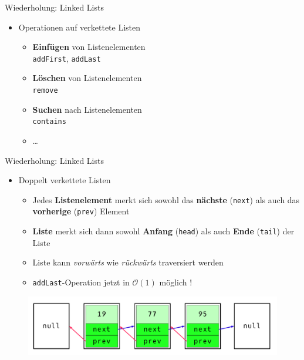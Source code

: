 \documentclass[18pt]{beamer}
\begin{document}
\begin{frame}{Wiederholung: Linked Lists}
    \begin{itemize}
        \item Operationen auf verkettete Listen
        \begin{itemize}
            \item \textbf{Einfügen} von Listenelementen\\
            \texttt{addFirst}, \texttt{addLast}
            \item \textbf{Löschen} von Listenelementen\\
            \texttt{remove}
            \item \textbf{Suchen} nach Listenelementen\\
            \texttt{contains}
            \item \dots
        \end{itemize}
    \end{itemize}

\end{frame}

\begin{frame}{Wiederholung: Linked Lists}
    \begin{itemize}
        \item Doppelt verkettete Listen
        \begin{itemize}
            \item Jedes \textbf{Listenelement} merkt sich sowohl das \textbf{nächste} (\texttt{next}) als auch das \textbf{vorherige} (\texttt{prev}) Element
            \item \textbf{Liste} merkt sich dann sowohl \textbf{Anfang} (\texttt{head}) als auch \textbf{Ende} (\texttt{tail}) der Liste
            \item Liste kann \textit{vorwärts} wie \textit{rückwärts} traversiert werden
            \item \texttt{addLast}-Operation jetzt in $\mathcal{O}(1)$ möglich !
        \end{itemize}
    \end{itemize}

    \begin{figure}
        \includegraphics[scale=.3]{img/doublelinkedlist.png}
    \end{figure}

\end{frame}
\end{document}
